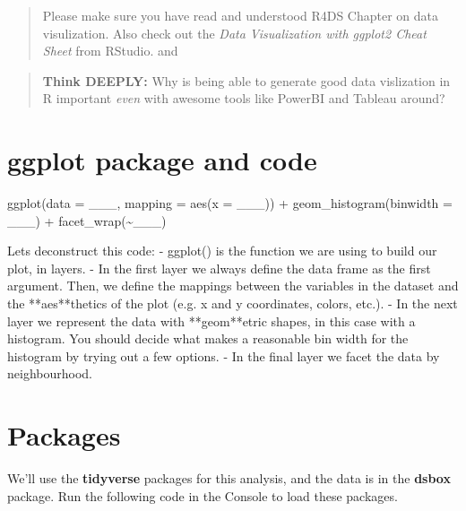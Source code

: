 \documentclass[
]{book}
\newenvironment{Shaded}{\begin{snugshade}}{\end{snugshade}}
\newcommand{\AttributeTok}[1]{\textcolor[rgb]{0.77,0.63,0.00}{#1}}
\newcommand{\FunctionTok}[1]{\textcolor[rgb]{0.00,0.00,0.00}{#1}}
\newcommand{\NormalTok}[1]{#1}
\newcommand{\SpecialCharTok}[1]{\textcolor[rgb]{0.00,0.00,0.00}{#1}}
\newcommand{\StringTok}[1]{\textcolor[rgb]{0.31,0.60,0.02}{#1}}
\begin{document}
\begin{quote}
Please make sure you have read and understood R4DS Chapter
on data visulization. Also check out the \emph{Data
Visualization with ggplot2 Cheat Sheet} from RStudio.
and
\end{quote}

\begin{quote}
\textbf{Think DEEPLY:} Why is being able to generate good data vislization in R important \emph{even} with awesome tools like PowerBI and Tableau around?
\end{quote}

\hypertarget{ggplot-package-and-code}{%
\section{ggplot package and code}\label{ggplot-package-and-code}}

\begin{Shaded}
\begin{Highlighting}[]
\FunctionTok{ggplot}\NormalTok{(}\AttributeTok{data =}\NormalTok{ \_\_\_, }\AttributeTok{mapping =} \FunctionTok{aes}\NormalTok{(}\AttributeTok{x =}\NormalTok{ \_\_\_)) }\SpecialCharTok{+}
  \FunctionTok{geom\_histogram}\NormalTok{(}\AttributeTok{binwidth =}\NormalTok{ \_\_\_) }\SpecialCharTok{+}
  \FunctionTok{facet\_wrap}\NormalTok{(}\SpecialCharTok{\textasciitilde{}}\NormalTok{\_\_\_)}

\NormalTok{Let}\StringTok{\textquotesingle{}s deconstruct this code: }
\StringTok{{-} \textasciigrave{}ggplot()\textasciigrave{} is the function we are using to build our plot, in layers.}
\StringTok{{-} In the first layer we always define the data frame as the first argument. Then, we define the mappings between the variables in the dataset and the **aes**thetics of the plot (e.g. x and y coordinates, colors, etc.). }
\StringTok{{-} In the next layer we represent the data with **geom**etric shapes, in this case with a histogram. You should decide what makes a reasonable bin width for the histogram by trying out a few options.}
\StringTok{{-} In the final layer we facet the data by neighbourhood.}
\end{Highlighting}
\end{Shaded}

\hypertarget{packages}{%
\section{Packages}\label{packages}}

We'll use the \textbf{tidyverse} packages for this analysis, and the data is in the \textbf{dsbox} package. Run the following code in the Console to load these packages.
\end{document}
